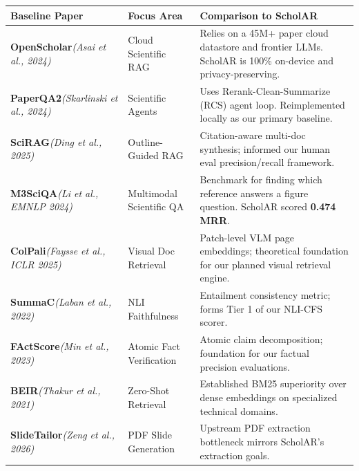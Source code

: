 \documentclass[10pt,a4paper]{article}
\begin{document}
\begin{table}[h!]
\centering
\small
\begin{tabularx}{\textwidth}{p{3.2cm} p{3.2cm} X}
\toprule
\textbf{Baseline Paper} & \textbf{Focus Area} & \textbf{Comparison to ScholAR} \\
\midrule
\textbf{OpenScholar}\newline \textit{(Asai et al., 2024)} & Cloud Scientific RAG & Relies on a 45M+ paper cloud datastore and frontier LLMs. ScholAR is 100\% on-device and privacy-preserving. \\
\addlinespace
\textbf{PaperQA2}\newline \textit{(Skarlinski et al., 2024)} & Scientific Agents & Uses Rerank-Clean-Summarize (RCS) agent loop. Reimplemented locally as our primary baseline. \\
\addlinespace
\textbf{SciRAG}\newline \textit{(Ding et al., 2025)} & Outline-Guided RAG & Citation-aware multi-doc synthesis; informed our human eval precision/recall framework. \\
\addlinespace
\textbf{M3SciQA}\newline \textit{(Li et al., EMNLP 2024)} & Multimodal Scientific QA & Benchmark for finding which reference answers a figure question. ScholAR scored \textbf{0.474 MRR}. \\
\addlinespace
\textbf{ColPali}\newline \textit{(Faysse et al., ICLR 2025)} & Visual Doc Retrieval & Patch-level VLM page embeddings; theoretical foundation for our planned visual retrieval engine. \\
\addlinespace
\textbf{SummaC}\newline \textit{(Laban et al., 2022)} & NLI Faithfulness & Entailment consistency metric; forms Tier 1 of our NLI-CFS scorer. \\
\addlinespace
\textbf{FActScore}\newline \textit{(Min et al., 2023)} & Atomic Fact Verification & Atomic claim decomposition; foundation for our factual precision evaluations. \\
\addlinespace
\textbf{BEIR}\newline \textit{(Thakur et al., 2021)} & Zero-Shot Retrieval & Established BM25 superiority over dense embeddings on specialized technical domains. \\
\addlinespace
\textbf{SlideTailor}\newline \textit{(Zeng et al., 2026)} & PDF Slide Generation & Upstream PDF extraction bottleneck mirrors ScholAR's extraction goals. \\
\bottomrule
\end{tabularx}
\end{table}
\end{document}
